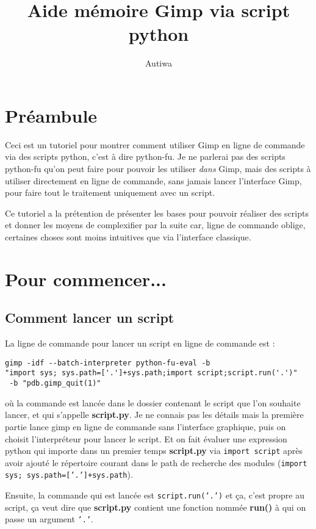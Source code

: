 \documentclass[a4paper,twoside]{article}
\title{Aide mémoire Gimp via script python}
\author{Autiwa}
\begin{document}
\tableofcontents

\clearpage

\section{Préambule}
Ceci est un tutoriel pour montrer comment utiliser Gimp en ligne de commande via des scripts python, c'est à dire python-fu. Je ne parlerai pas des scripts python-fu qu'on peut faire pour pouvoir les utiliser \textit{dans} Gimp, mais des scripts à utiliser directement en ligne de commande, sans jamais lancer l'interface Gimp, pour faire tout le traitement uniquement avec un script. 

Ce tutoriel a la prétention de présenter les bases pour pouvoir réaliser des scripts et donner les moyens de complexifier par la suite car, ligne de commande oblige, certaines choses sont moins intuitives que via l'interface classique.

\section{Pour commencer...}
\subsection{Comment lancer un script}
La ligne de commande pour lancer un script en ligne de commande est : 
\begin{verbatim}
gimp -idf --batch-interpreter python-fu-eval -b 
"import sys; sys.path=['.']+sys.path;import script;script.run('.')"
 -b "pdb.gimp_quit(1)"
\end{verbatim}
où la commande est lancée dans le dossier contenant le script que l'on souhaite lancer, et qui s'appelle \textbf{script.py}. Je ne connais pas les détails mais la première partie lance gimp en ligne de commande sans l'interface graphique, puis on choisit l'interpréteur pour lancer le script. Et on fait évaluer une expression python qui importe dans un premier temps \textbf{script.py} via \texttt{import script} après avoir ajouté le répertoire courant dans le path de recherche des modules (\texttt{import sys; sys.path=['.']+sys.path}). 

Ensuite, la commande qui est lancée est \texttt{script.run('.')} et ça, c'est propre au script, ça veut dire que \textbf{script.py} contient une fonction nommée \textbf{run()} à qui on passe un argument \texttt{'.'}.
\end{document}
